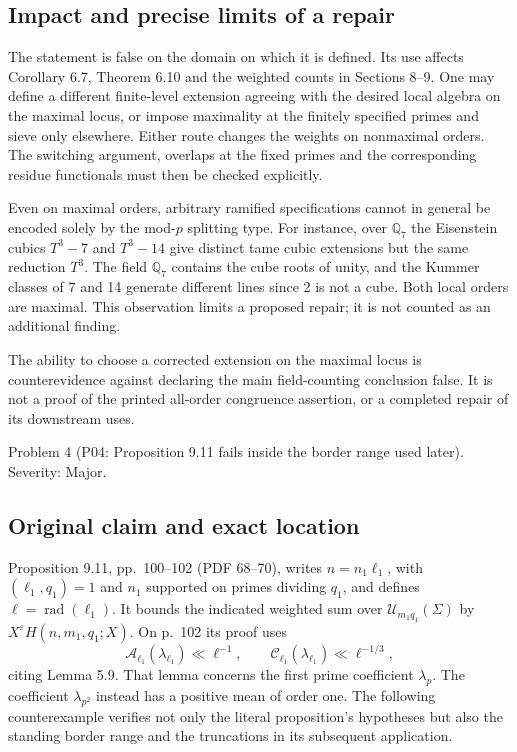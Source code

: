 \documentclass[10pt]{article}
\begin{document}
\subsection*{Impact and precise limits of a repair}
The statement is false on the domain on which it is defined. Its use affects Corollary 6.7, Theorem 6.10 and the weighted counts in Sections 8–9. One may define a different finite-level extension agreeing with the desired local algebra on the maximal locus, or impose maximality at the finitely specified primes and sieve only elsewhere. Either route changes the weights on nonmaximal orders. The switching argument, overlaps at the fixed primes and the corresponding residue functionals must then be checked explicitly.\par
Even on maximal orders, arbitrary ramified specifications cannot in general be encoded solely by the mod-\(p\) splitting type. For instance, over \(\mathbb Q_7\) the Eisenstein cubics \(T^3-7\) and \(T^3-14\) give distinct tame cubic extensions but the same reduction \(T^3\). The field \(\mathbb Q_7\) contains the cube roots of unity, and the Kummer classes of 7 and 14 generate different lines since 2 is not a cube. Both local orders are maximal. This observation limits a proposed repair; it is not counted as an additional finding.\par
The ability to choose a corrected extension on the maximal locus is counterevidence against declaring the main field-counting conclusion false. It is not a proof of the printed all-order congruence assertion, or a completed repair of its downstream uses.\par
Problem 4 (P04: Proposition 9.11 fails inside the border range used later).  Severity: Major.\par
\subsection*{Original claim and exact location}
Proposition 9.11, pp. 100–102 (PDF 68–70), writes \(n=n_1\ell_1\), with \((\ell_1,q_1)=1\) and \(n_1\) supported on primes dividing \(q_1\), and defines \(\ell=\operatorname{rad}(\ell_1)\). It bounds the indicated weighted sum over \(\mathcal U_{m_1q_1}(\Sigma)\) by \(X^\varepsilon H(n,m_1,q_1;X)\). On p. 102 its proof uses \[\mathcal A_{\ell_1}(\lambda_{\ell_1})\ll \ell^{-1},
 \qquad
 \mathcal C_{\ell_1}(\lambda_{\ell_1})\ll \ell^{-1/3},\] citing Lemma 5.9. That lemma concerns the first prime coefficient \(\lambda_p\). The coefficient \(\lambda_{p^2}\) instead has a positive mean of order one. The following counterexample verifies not only the literal proposition’s hypotheses but also the standing border range and the truncations in its subsequent application.\par
\end{document}
